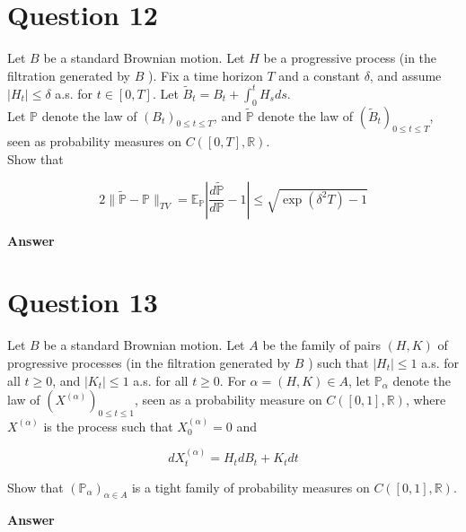 \documentclass[letterpaper]{article}
\begin{document}
		\clearpage
		
		\section{Question 12}
		
		Let $B$ be a standard Brownian motion. Let $H$ be a progressive process (in the filtration generated by $B$ ). Fix a time horizon $T$ and a constant $\delta$, and assume $\left|H_{t}\right| \leq \delta$ a.s. for $t \in[0, T]$. Let $\tilde{B}_{t}=B_{t}+\int_{0}^{t} H_{s} d s$.\\
		Let $\mathbb{P}$ denote the law of $\left(B_{t}\right)_{0 \leq t \leq T}$, and $\tilde{\mathbb{P}}$ denote the law of $\left(\tilde{B}_{t}\right)_{0 \leq t \leq T}$, seen as probability measures on $C([0, T], \mathbb{R})$.\\
		Show that
		
		$$
		2\|\tilde{\mathbb{P}}-\mathbb{P}\|_{T V}=\mathbb{E}_{\mathbb{P}}\left|\frac{d \tilde{\mathbb{P}}}{d \mathbb{P}}-1\right| \leq \sqrt{\exp \left(\delta^{2} T\right)-1}
		$$
		
		\textbf{Answer}
		
		\clearpage
		
		\section{Question 13}
		
		Let $B$ be a standard Brownian motion. Let $A$ be the family of pairs $(H, K)$ of progressive processes (in the filtration generated by $B$ ) such that $\left|H_{t}\right| \leq 1$ a.s. for all $t \geq 0$, and $\left|K_{t}\right| \leq 1$ a.s. for all $t \geq 0$. For $\alpha=(H, K) \in A$, let $\mathbb{P}_{\alpha}$ denote the law of $\left(X^{(\alpha)}\right)_{0 \leq t \leq 1}$, seen as a probability measure on $C([0,1], \mathbb{R})$, where $X^{(\alpha)}$ is the process such that $X_{0}^{(\alpha)}=0$ and
		
		$$
		d X_{t}^{(\alpha)}=H_{t} d B_{t}+K_{t} d t
		$$
		
		Show that $\left(\mathbb{P}_{\alpha}\right)_{\alpha \in A}$ is a tight family of probability measures on $C([0,1], \mathbb{R})$.
		
		
		
		\textbf{Answer}
		
		\clearpage
		
		
	
\end{document}

